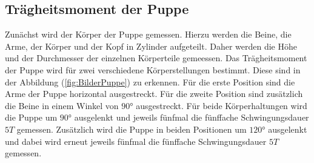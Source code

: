 \subsection{Trägheitsmoment der Puppe}
\label{sec:TragheitPuppe}
%
Zunächst wird der Körper der Puppe gemessen. Hierzu werden die Beine, die Arme, der Körper und der Kopf in Zylinder
aufgeteilt. Daher werden die Höhe und der Durchmesser der einzelnen Körperteile gemeessen. Das Trägheitsmoment der Puppe wird 
für zwei verschiedene Körperstellungen bestimmt. Diese sind in der Abbildung (\ref{fig:BilderPuppe}) zu erkennen. Für die erste Position sind die Arme der Puppe horizontal ausgestreckt. 
Für die zweite Position sind zusätzlich die Beine in einem Winkel von $90°$ ausgestreckt. Für beide Körperhaltungen wird 
die Puppe um $90°$ ausgelenkt und jeweils fünfmal die fünffache Schwingungsdauer $5T$ gemessen. Zusätzlich wird die Puppe 
in beiden Positionen um $120°$ ausgelenkt und dabei wird erneut jeweils fünfmal die fünffache Schwingungsdauer $5T$ gemessen. 
%
